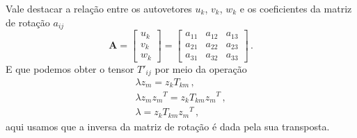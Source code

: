 Vale destacar a rela\c{c}\~ao entre os autovetores $u_{k}$, $v_{k}$, $w_{k}$ e os coeficientes 
da matriz de rota\c{c}\~ao $a_{ij}$
\begin{equation}
  \pmb{A} = \begin{bmatrix}
    u_k \\
    v_k \\
    w_k
  \end{bmatrix} = \begin{bmatrix}
    a_{11} & a_{12} &a_{13} \\
    a_{21} & a_{22} &a_{23} \\
    a_{31} & a_{32} &a_{33} 
  \end{bmatrix}
  \, .
\end{equation}
E que podemos obter o tensor $T'_{ij}$ por meio da opera\c{c}\~ao
\begin{align}
  \lambda z_m = z_kT_{km}  \, ,\\
  \lambda z_m {z_m}^T = z_kT_{km}{z_m}^T \, , \\
  \lambda = z_kT_{km}{z_m}^T \, ,
\end{align}
aqui usamos que a inversa da matriz de rota\c{c}\~ao \'e dada pela sua
transposta.

